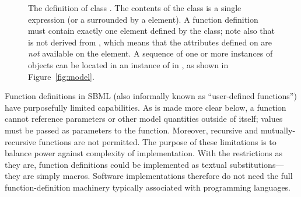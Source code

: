 \begin{figure}[htb]
  \centering
  \small
  \caption{The definition of class \FunctionDefinition.
      The contents of the  class is a single \mathml
       expression (or a  surrounded by
      a  element).  A function definition must
      contain exactly one  element defined by the
       class; note also that  is not
      derived from \SBase, which means that the attributes defined
      on \SBase are \emph{not} available on the 
      element.  A sequence of one or more instances of
      \FunctionDefinition objects can be located in an instance of
      \ListOfFunctionDefinitions in \Model, as shown in
      Figure~\protect\ref{fig:model}.}
  \label{fig:mathdefinition}
  \label{fig:functionDefinition}
\end{figure}

Function definitions in SBML (also informally known as
``user-defined functions'') have purposefully limited capabilities.
As is made more clear below, a function cannot reference
parameters or other model quantities outside of itself; values
must be passed as parameters to the function.  Moreover, recursive
and mutually-recursive functions are not permitted.  The purpose
of these limitations is to balance power against complexity of
implementation.  With the restrictions as they are, function
definitions could be implemented as textual substitutions---they
are simply macros.  Software implementations therefore do not need
the full function-definition machinery typically associated with
programming languages.


